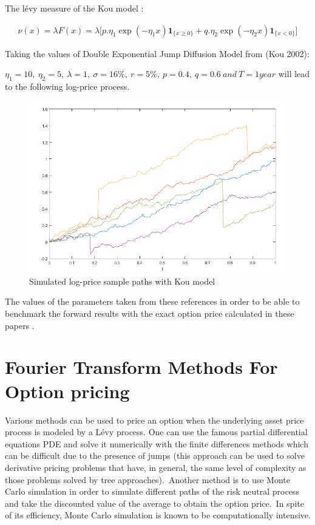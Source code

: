 \documentclass[12pt]{report}
\begin{document}
The lévy measure of the Kou model :

\begin{gather}
 \nu(x)=\lambda F(x)=\lambda \big[ p.\eta_1 \exp \left( -\eta_1 x \right) \mathbf{1}_{\{x\geqslant 0\}}+ q .\eta_2 \exp \left( -\eta_2 x \right) \mathbf{1}_{\{x < 0\}}\big]
\end{gather}

Taking the values of Double Exponential Jump Diffusion Model  from (Kou 2002):

$ \eta_1= 10,~\eta_2= 5,~\lambda=1,~\sigma= 16\%,~r=5\%,~ p=0.4,~ q=0.6 ~ and ~T=1 year $ will lead to the following log-price process.

\begin{figure}[h]

\centering
\includegraphics[scale=0.7]{kou.png} 
\caption{Simulated log-price sample paths with Kou model }
\end{figure}

The values of the parameters  taken from these  references in order to be able to benchmark the forward results  with the exact option price calculated in these papers .

\chapter{Fourier Transform Methods For Option pricing }

Various methods can be used to price an option when the underlying
asset price process is modeled by a Lévy process. One can use the famous partial differential equations PDE  and solve it numerically with the finite differences methods which  can be difficult due to the presence of jumps (this approach can be used to solve derivative pricing problems that have, in general, the same level of complexity as those problems solved by tree approaches).~Another method is to use Monte Carlo simulation in order to simulate different paths of the risk neutral process and take the discounted value of the average to obtain the option price.~In spite of its efficiency, Monte Carlo simulation is known to be computationally intensive. \\
\end{document}
